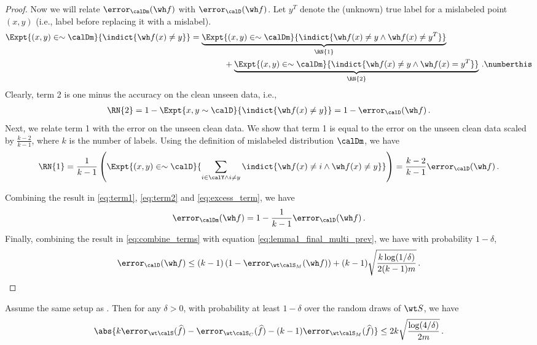 \begin{proof}
    Now we will relate $\error_{\calDm} (\wh f)$ with $\error_{\calD}(\wh f)$. 
    Let $y^T$ denote the (unknown) true label 
    for a mislabeled point $(x, y)$ 
    (i.e., label before replacing it with a mislabel). 
    \begin{align*}    
         \Expt{(x, y) \in \sim \calDm}{\indict{ \wh f(x) \ne y }}  &= \underbrace{\Expt{(x, y) \in \sim \calDm}{\indict{ \wh f(x) \ne y \land \wh f(x) \ne y^T}}}_{\RN{1}} \\ &\qquad \qquad + \underbrace{\Expt{(x, y) \in \sim \calDm}{\indict{ \wh f(x) \ne y \land \wh f(x) = y^T}}}_{\RN{2}} \,. \numberthis \label{eq:excess_term}
    \end{align*}
    Clearly, term 2 is one minus the accuracy 
    on the clean unseen data, i.e.,
    \begin{align}
        \RN{2} = 1 - \Expt{{x,y} \sim \calD}{ \indict{ \wh f(x) \ne y}} = 1- \error_{\calD}(\wh f) \,. \label{eq:term1}    
    \end{align}
    Next, we relate term 1 with the error on the unseen clean data. 
    We show that term 1 is equal to the error on the unseen clean data 
    scaled by $\frac{k-2}{k-1}$,
    where $k$ is the number of labels.
    Using the definition of mislabeled distribution $\calDm$,  
    we have 
    \begin{align}
        \RN{1} = \frac{1}{k-1} \left( \Expt{(x, y) \in \sim \calD}{ \sum_{i \in \calY \land i\ne y}  \indict{ \wh f(x) \ne i \land \wh f(x) \ne y}} \right) = \frac{k-2}{k-1} \error_{\calD}(\wh f) \,.\label{eq:term2}
    \end{align}    

    Combining the result in \eqref{eq:term1}, \eqref{eq:term2} and \eqref{eq:excess_term}, we have 
    \begin{align}
        \error_{\calDm}(\wh f) = 1- \frac{1}{k-1} \error_{\calD}(\wh f) \,.\label{eq:combine_terms}
    \end{align}
    Finally, combining the result in \eqref{eq:combine_terms} 
    with equation \eqref{eq:lemma1_final_multi_prev}, 
    we have with probability $1-\delta$, 
    \begin{align}
      \error_{\calD}(\wh f) \le  (k-1) \left( 1- \error_{ \wt \calS_M}(\wh f) \right)  + (k-1) \sqrt{\frac{k \log(1/\delta)}{ 2(k-1)m}} \,. \label{eq:lemma1_final_multi}
    \end{align}
\end{proof}

\begin{lemma} \label{lem:mislabeled_error_multi}
    Assume the same setup as . 
    Then for any $\delta >0$, 
    with probability at least $1-\delta$ 
    over the random draws of $\wt S$, we have  
        $$\abs{k\error_{\wt \calS}(\widehat f) - \error_{\wt \calS_C}(\widehat f) -  (k-1)\error_{\wt \calS_M}(\widehat f) } \le  2k\sqrt{\frac{\log(4/\delta)}{2m}}\,. $$ %
\end{lemma} 


